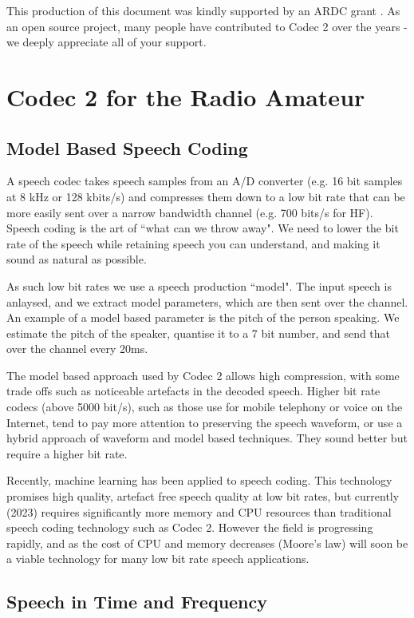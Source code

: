 \documentclass{article}
\begin{document}
This production of this document was kindly supported by an ARDC grant \cite{ardc2023}.  As an open source project, many people have contributed to Codec 2 over the years - we deeply appreciate all of your support.

\section{Codec 2 for the Radio Amateur}
\label{sect:overview}

\subsection{Model Based Speech Coding}

A speech codec takes speech samples from an A/D converter (e.g. 16 bit samples at 8 kHz or 128 kbits/s) and compresses them down to a low bit rate that can be more easily sent over a narrow bandwidth channel (e.g. 700 bits/s for HF).  Speech coding is the art of ``what can we throw away". We need to lower the bit rate of the speech while retaining speech you can understand, and making it sound as natural as possible.

As such low bit rates we use a speech production ``model".  The input speech is anlaysed, and we extract model parameters, which are then sent over the channel.  An example of a model based parameter is the pitch of the person speaking.  We estimate the pitch of the speaker, quantise it to a 7 bit number, and send that over the channel every 20ms.

The model based approach used by Codec 2 allows high compression, with some trade offs such as noticeable artefacts in the decoded speech.  Higher bit rate codecs (above 5000 bit/s), such as those use for mobile telephony or voice on the Internet, tend to pay more attention to preserving the speech waveform, or use a hybrid approach of waveform and model based techniques.  They sound better but require a higher bit rate.

Recently, machine learning has been applied to speech coding.  This technology promises high quality, artefact free speech quality at low bit rates, but currently (2023) requires significantly more memory and CPU resources than traditional speech coding technology such as Codec 2.  However the field is progressing rapidly, and as the cost of CPU and memory decreases (Moore's law) will soon be a viable technology for many low bit rate speech applications.

\subsection{Speech in Time and Frequency}
\end{document}
